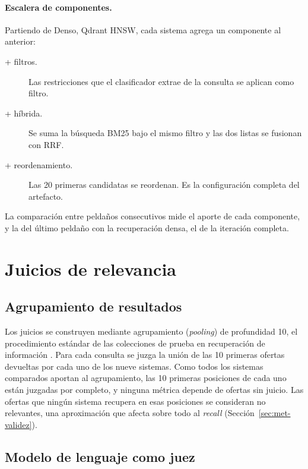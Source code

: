 \paragraph{Escalera de componentes.} Partiendo de Denso, Qdrant HNSW, cada sistema agrega un componente al anterior:
\begin{description}
    \item[+ filtros.] Las restricciones que el clasificador extrae de la consulta se aplican como filtro.
    \item[+ híbrida.] Se suma la búsqueda BM25 bajo el mismo filtro y las dos listas se fusionan con RRF.
    \item[+ reordenamiento.] Las 20 primeras candidatas se reordenan. Es la configuración completa del artefacto.
\end{description}
La comparación entre peldaños consecutivos mide el aporte de cada componente, y la del último peldaño con la recuperación densa, el de la iteración completa.

\section{Juicios de relevancia}
\label{sec:met-juicios}

\subsection{Agrupamiento de resultados}

Los juicios se construyen mediante agrupamiento (\textit{pooling}) de profundidad 10, el procedimiento estándar de las colecciones de prueba en recuperación de información \citep{Sanderson2010}. Para cada consulta se juzga la unión de las 10 primeras ofertas devueltas por cada uno de los nueve sistemas. Como todos los sistemas comparados aportan al agrupamiento, las 10 primeras posiciones de cada uno están juzgadas por completo, y ninguna métrica depende de ofertas sin juicio. Las ofertas que ningún sistema recupera en esas posiciones se consideran no relevantes, una aproximación que afecta sobre todo al \textit{recall} (Sección~\ref{sec:met-validez}).

\subsection{Modelo de lenguaje como juez}


